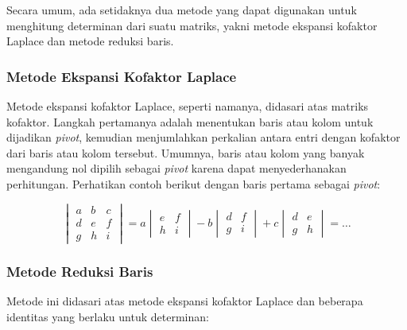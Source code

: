     Secara umum, ada setidaknya dua metode yang dapat digunakan untuk menghitung determinan dari suatu matriks, yakni metode ekspansi kofaktor Laplace dan metode reduksi baris.

    \subsubsection{Metode Ekspansi Kofaktor Laplace}
    Metode ekspansi kofaktor Laplace, seperti namanya, didasari atas matriks kofaktor. Langkah pertamanya adalah menentukan baris atau kolom untuk dijadikan \textit{pivot}, kemudian menjumlahkan perkalian antara entri dengan kofaktor dari baris atau kolom tersebut. Umumnya, baris atau kolom yang banyak mengandung nol dipilih sebagai \textit{pivot} karena dapat menyederhanakan perhitungan. Perhatikan contoh berikut dengan baris pertama sebagai \textit{pivot}:

    \[\begin{vmatrix}
        a & b & c \\    
        d & e & f \\
        g & h & i 
      \end{vmatrix} = 
      a \begin{vmatrix}
          e & f \\ h & i
      \end{vmatrix}
      - b  \begin{vmatrix}
          d & f \\ g & i
      \end{vmatrix}
      + c \begin{vmatrix}
          d & e \\ g & h
      \end{vmatrix}
      = \ldots
    \]

    \subsubsection{Metode Reduksi Baris}
        Metode ini didasari atas metode ekspansi kofaktor Laplace dan beberapa identitas yang berlaku untuk determinan:


